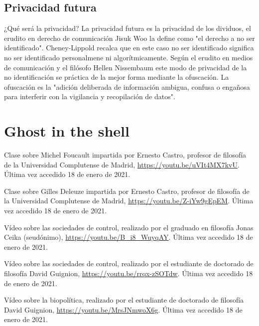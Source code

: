 \documentclass[11pt]{article}
\begin{document}
\subsection{Privacidad futura}
¿Qué será la privacidad? La privacidad futura es la privacidad de los dividuos, el erudito en derecho de comunicación Jisuk Woo la define como "el derecho a no ser identificado". Cheney-Lippold recalca que en este caso no ser identificado significa no ser identificado personalmene ni algorítmicamente. Según el erudito en medios de comunicación y el filósofo Hellen Nissembaum este modo de privacidad de la no identificación se práctica de la mejor forma mediante la ofuscación. La ofuscación es la "adición deliberada de información ambigua, confusa o engañosa para interferir con la vigilancia y recopilación de datos".
\section{Ghost in the shell}
\begin{thebibliography}{8}
        Clase sobre Michel Foucault impartida por Ernesto Castro, profesor de filosofía de la Universidad Complutense de Madrid, \url{https://youtu.be/uVIt4MX7kvU}. Última vez accedido 18 de enero de 2021.

        Clase sobre Gilles Deleuze impartida por Ernesto Castro, profesor de filosofía de la Universidad Complutense de Madrid, \url{https://youtu.be/Z-iYw9gEpEM}. Última vez accedido 18 de enero de 2021.

        Vídeo sobre las sociedades de control, realizado por el graduado en filosofía Jonas Ceika (seudónimo), \url{https://youtu.be/B_i8_WuyqAY}. Última vez accedido 18 de enero de 2021.

        Vídeo sobre las sociedades de control, realizado por el estudiante de doctorado de filosofía David Guignion, \url{https://youtu.be/rrqx-zSOTdw}. Última vez accedido 18 de enero de 2021.

        Vídeo sobre la biopolítica, realizado por el estudiante de doctorado de filosofía David Guignion, \url{https://youtu.be/MrsJNmwoX6g}. Última vez accedido 18 de enero de 2021.
\end{thebibliography}
\end{document}
